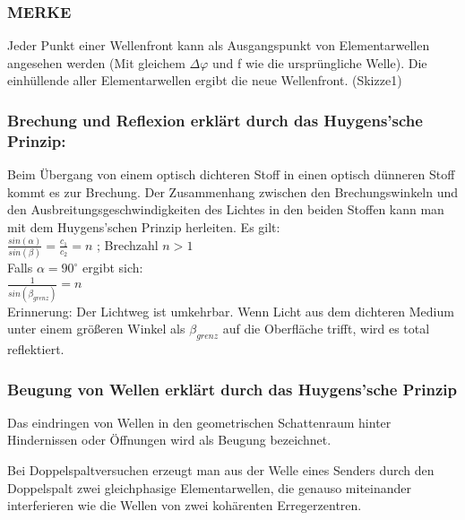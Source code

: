 			\subsubsection{MERKE} 
			
			Jeder Punkt einer Wellenfront kann als Ausgangspunkt von Elementarwellen angesehen werden (Mit gleichem $\Delta \varphi$ und f wie die ursprüngliche Welle). Die einhüllende aller Elementarwellen ergibt die neue Wellenfront. (Skizze1)
			
			\subsubsection{Brechung und Reflexion erklärt durch das Huygens'sche Prinzip:} 
			
			Beim Übergang von einem optisch dichteren Stoff in einen optisch dünneren Stoff kommt es zur Brechung. Der Zusammenhang zwischen den Brechungswinkeln und den Ausbreitungsgeschwindigkeiten des Lichtes in den beiden Stoffen kann man mit dem Huygens'schen Prinzip herleiten.  Es gilt: 
			\vspace{2mm} \\
			$ \frac{sin(\alpha)}{sin(\beta)} = \frac{c_1}{c_2} = n $ ; Brechzahl $ n>1 $
			\vspace{5mm} \\
			Falls $ \alpha = 90^{\circ} $ ergibt sich:
			\vspace{1mm} \\
			$ \frac{1}{sin(\beta_{grenz})} = n$
			\vspace{5mm} \\
			Erinnerung: Der Lichtweg ist umkehrbar. Wenn Licht aus dem dichteren Medium unter einem größeren Winkel als $\beta_{grenz}$ auf die Oberfläche trifft, wird es total reflektiert.
			\newpage
			
			\subsubsection{Beugung von Wellen erklärt durch das Huygens'sche Prinzip}
			
			Das eindringen von Wellen in den geometrischen Schattenraum hinter Hindernissen oder Öffnungen wird als Beugung bezeichnet. 
			
			Bei Doppelspaltversuchen erzeugt man aus der Welle eines Senders durch den Doppelspalt zwei gleichphasige Elementarwellen, die genauso miteinander interferieren wie die Wellen von zwei kohärenten Erregerzentren.